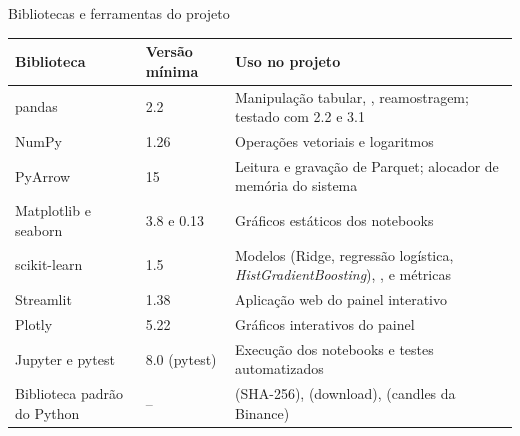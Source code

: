 \begin{quadro}[htbp]
\caption{\label{qua:tecnologias}Bibliotecas e ferramentas do projeto}
\begin{corpotabela}
\begin{tabularx}{\textwidth}{|L{3.4cm}|C{2.2cm}|Y|}
\hline
\textbf{Biblioteca} & \textbf{Versão mínima} & \textbf{Uso no projeto} \\ \hline
pandas \cite{mckinney2010} & 2.2 & Manipulação tabular, , reamostragem; testado com 2.2 e 3.1 \\ \hline
NumPy \cite{harris2020} & 1.26 & Operações vetoriais e logaritmos \\ \hline
PyArrow \cite{arrow2026} & 15 & Leitura e gravação de Parquet; alocador de memória do sistema \\ \hline
Matplotlib \cite{hunter2007} e seaborn \cite{waskom2021} & 3.8 e 0.13 & Gráficos estáticos dos notebooks \\ \hline
scikit-learn \cite{pedregosa2011} & 1.5 & Modelos (Ridge, regressão logística, \textit{HistGradientBoosting}), ,  e métricas \\ \hline
Streamlit \cite{streamlit2026} & 1.38 & Aplicação web do painel interativo \\ \hline
Plotly \cite{plotly2015} & 5.22 & Gráficos interativos do painel \\ \hline
Jupyter e pytest & 8.0 (pytest) & Execução dos notebooks e testes automatizados \\ \hline
Biblioteca padrão do Python & -- &  (SHA-256),  (download),  (candles da Binance) \\ \hline
\end{tabularx}
\end{corpotabela}
\fonteautores[Elaborado]
\end{quadro}
